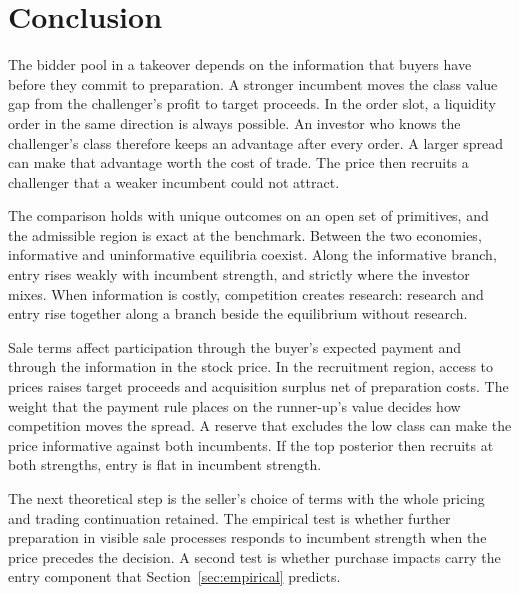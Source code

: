 \section{Conclusion}\label{sec:conclusion}

The bidder pool in a takeover depends on the information that buyers have before they commit to preparation. A
stronger incumbent moves the class value gap from the challenger's profit to target proceeds. In the order slot, a
liquidity order in the same direction is always possible. An investor who knows the challenger's class therefore
keeps an advantage after every order. A larger spread can make that advantage worth the cost of trade. The price then
recruits a challenger that a weaker incumbent could not attract.

The comparison holds with unique outcomes on an open set of primitives, and the admissible region is exact at the
benchmark. Between the two economies, informative and uninformative equilibria coexist. Along the informative branch,
entry rises weakly with incumbent strength, and strictly where the investor mixes. When information is costly,
competition creates research: research and entry rise together along a branch beside the equilibrium without
research.

Sale terms affect participation through the buyer's expected payment and through the information in the stock price.
In the recruitment region, access to prices raises target proceeds and acquisition surplus net of preparation costs.
The weight that the payment rule places on the runner-up's value decides how competition moves the spread. A reserve
that excludes the low class can make the price informative against both incumbents. If the top posterior then
recruits at both strengths, entry is flat in incumbent strength.

The next theoretical step is the seller's choice of terms with the whole pricing and trading continuation retained.
The empirical test is whether further preparation in visible sale processes responds to incumbent strength when the
price precedes the decision. A second test is whether purchase impacts carry the entry component that
Section~\ref{sec:empirical} predicts.
